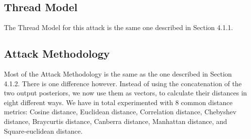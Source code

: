 

    \subsection{Thread Model}

      The Thread Model for this attack is the same one described in Section 4.1.1.

    \subsection{Attack Methodology}

      Most of the Attack Methodology is the same as the one described in Section 4.1.2.
      There is one difference however.
      Instead of using the concatenation of the two output posteriors, we now use them as vectors, to calculate their distances in eight different ways.
      We have in total experimented with 8 common distance metrics: Cosine distance, Euclidean distance, Correlation distance, Chebyshev distance, Braycurtis distance, Canberra distance, Manhattan distance, and Square-euclidean distance.

